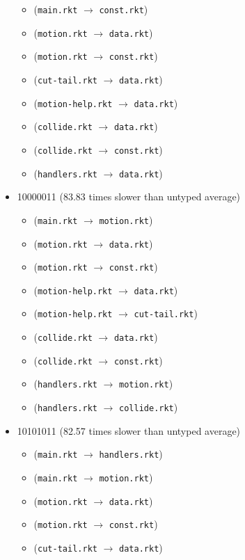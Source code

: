 \documentclass{article}
\newcommand{\mono}[1]{\texttt{#1}}
\begin{document}
\begin{itemize}
\begin{itemize}
  \item (\mono{main.rkt} $\rightarrow$ \mono{const.rkt})
  \item (\mono{motion.rkt} $\rightarrow$ \mono{data.rkt})
  \item (\mono{motion.rkt} $\rightarrow$ \mono{const.rkt})
  \item (\mono{cut-tail.rkt} $\rightarrow$ \mono{data.rkt})
  \item (\mono{motion-help.rkt} $\rightarrow$ \mono{data.rkt})
  \item (\mono{collide.rkt} $\rightarrow$ \mono{data.rkt})
  \item (\mono{collide.rkt} $\rightarrow$ \mono{const.rkt})
  \item (\mono{handlers.rkt} $\rightarrow$ \mono{data.rkt})
  \end{itemize}
\item 10000011 (83.83 times slower than untyped average)
  \begin{itemize}
  \item (\mono{main.rkt} $\rightarrow$ \mono{motion.rkt})
  \item (\mono{motion.rkt} $\rightarrow$ \mono{data.rkt})
  \item (\mono{motion.rkt} $\rightarrow$ \mono{const.rkt})
  \item (\mono{motion-help.rkt} $\rightarrow$ \mono{data.rkt})
  \item (\mono{motion-help.rkt} $\rightarrow$ \mono{cut-tail.rkt})
  \item (\mono{collide.rkt} $\rightarrow$ \mono{data.rkt})
  \item (\mono{collide.rkt} $\rightarrow$ \mono{const.rkt})
  \item (\mono{handlers.rkt} $\rightarrow$ \mono{motion.rkt})
  \item (\mono{handlers.rkt} $\rightarrow$ \mono{collide.rkt})
  \end{itemize}
\item 10101011 (82.57 times slower than untyped average)
  \begin{itemize}
  \item (\mono{main.rkt} $\rightarrow$ \mono{handlers.rkt})
  \item (\mono{main.rkt} $\rightarrow$ \mono{motion.rkt})
  \item (\mono{motion.rkt} $\rightarrow$ \mono{data.rkt})
  \item (\mono{motion.rkt} $\rightarrow$ \mono{const.rkt})
  \item (\mono{cut-tail.rkt} $\rightarrow$ \mono{data.rkt})

\end{itemize}
\end{itemize}
\end{document}
